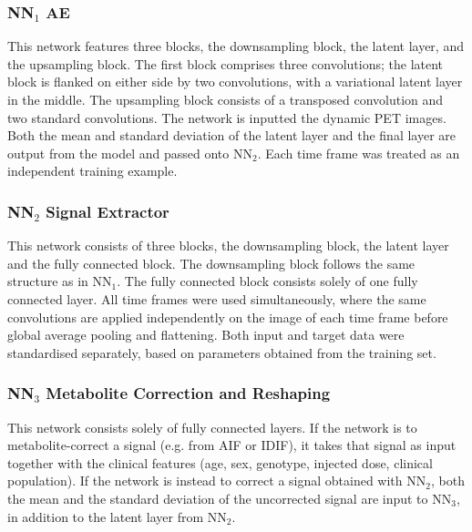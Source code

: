         \subsubsection{\gls{NN}$_1$ \gls{AE}} \label{sec:NN1}
            This network features three blocks, the downsampling block, the latent layer, and the upsampling block. The first block comprises three convolutions; the latent block is flanked on either side by two convolutions, with a variational latent layer in the middle. The upsampling block consists of a transposed convolution and two standard convolutions. The network is inputted the dynamic PET images. Both the mean and standard deviation of the latent layer and the final layer are output from the model and passed onto \gls{NN}$_2$. Each time frame was treated as an independent training example.


        \subsubsection{\gls{NN}$_2$ Signal Extractor} \label{sec:NN2}
            This network consists of three blocks, the downsampling block, the latent layer and the fully connected block. The downsampling block follows the same structure as in \gls{NN}$_1$. The fully connected block consists solely of one fully connected layer. All time frames were used simultaneously, where the same convolutions are applied independently on the image of each time frame before global average pooling and flattening. Both input and target data were standardised separately, based on parameters obtained from the training set.
            
        \subsubsection{\gls{NN}$_3$ Metabolite Correction and Reshaping} \label{sec:NN3}
            This network consists solely of fully connected layers. If the network is to metabolite-correct a signal (e.g. from \gls{AIF} or \gls{IDIF}), it takes that signal as input together with the clinical features (age, sex, genotype, injected dose, clinical population).  If the network is instead to correct a signal obtained with \gls{NN}$_2$, both the mean and the standard deviation of the uncorrected signal are input to \gls{NN}$_3$, in addition to the latent layer from \gls{NN}$_2$. %

